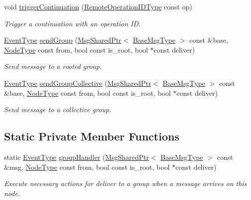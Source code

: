 \begin{DoxyCompactItemize}
void \hyperlink{structvt_1_1group_1_1_group_manager_aaa86d701377ece72b51bc7a2d0a945b0}{trigger\+Continuation} (\hyperlink{namespacevt_1_1group_a73f2624ddeb535b39a08b6524f26b244}{Remote\+Operation\+I\+D\+Type} const op)
\begin{DoxyCompactList}\small\item\em Trigger a continuation with an operation ID. \end{DoxyCompactList}\item 
\hyperlink{namespacevt_a009267401def7ae8bf201892222d060f}{Event\+Type} \hyperlink{structvt_1_1group_1_1_group_manager_ab891e435af2cc91826fe1069f08f5a65}{send\+Group} (\hyperlink{namespacevt_ab2b3d506ec8e8d1540aede826d84a239}{Msg\+Shared\+Ptr}$<$ \hyperlink{namespacevt_a44d0d4e144748f2b19a1cfd962f50338}{Base\+Msg\+Type} $>$ const \&base, \hyperlink{namespacevt_a866da9d0efc19c0a1ce79e9e492f47e2}{Node\+Type} const from, bool const is\+\_\+root, bool $\ast$const deliver)
\begin{DoxyCompactList}\small\item\em Send message to a rooted group. \end{DoxyCompactList}\item 
\hyperlink{namespacevt_a009267401def7ae8bf201892222d060f}{Event\+Type} \hyperlink{structvt_1_1group_1_1_group_manager_aa6717c21f320e14c4cae26d41da32e5b}{send\+Group\+Collective} (\hyperlink{namespacevt_ab2b3d506ec8e8d1540aede826d84a239}{Msg\+Shared\+Ptr}$<$ \hyperlink{namespacevt_a44d0d4e144748f2b19a1cfd962f50338}{Base\+Msg\+Type} $>$ const \&base, \hyperlink{namespacevt_a866da9d0efc19c0a1ce79e9e492f47e2}{Node\+Type} const from, bool const is\+\_\+root, bool $\ast$const deliver)
\begin{DoxyCompactList}\small\item\em Send message to a collective group. \end{DoxyCompactList}\end{DoxyCompactItemize}
\subsection*{Static Private Member Functions}
\begin{DoxyCompactItemize}
\item 
static \hyperlink{namespacevt_a009267401def7ae8bf201892222d060f}{Event\+Type} \hyperlink{structvt_1_1group_1_1_group_manager_a586641c48722f3288339a91be37781bd}{group\+Handler} (\hyperlink{namespacevt_ab2b3d506ec8e8d1540aede826d84a239}{Msg\+Shared\+Ptr}$<$ \hyperlink{namespacevt_a44d0d4e144748f2b19a1cfd962f50338}{Base\+Msg\+Type} $>$ const \&msg, \hyperlink{namespacevt_a866da9d0efc19c0a1ce79e9e492f47e2}{Node\+Type} const from, bool const is\+\_\+root, bool $\ast$const deliver)
\begin{DoxyCompactList}\small\item\em Execute necessary actions for deliver to a group when a message arrives on this node. \end{DoxyCompactList}\end{DoxyCompactItemize}
